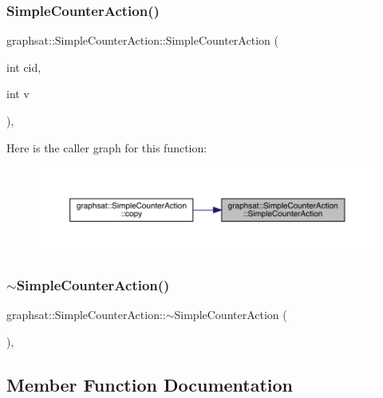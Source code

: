 \subsubsection{\texorpdfstring{SimpleCounterAction()}{SimpleCounterAction()}}
{\footnotesize\ttfamily graphsat\+::\+Simple\+Counter\+Action\+::\+Simple\+Counter\+Action (\begin{DoxyParamCaption}\item[{int}]{cid,  }\item[{int}]{v }\end{DoxyParamCaption})\hspace{0.3cm}{\ttfamily [inline]}, {\ttfamily [private]}}

Here is the caller graph for this function\+:
\nopagebreak
\begin{figure}[H]
\begin{center}
\leavevmode
\includegraphics[width=350pt]{classgraphsat_1_1_simple_counter_action_a3ee736027670066182093dd89fed7261_icgraph}
\end{center}
\end{figure}
\mbox{\label{classgraphsat_1_1_simple_counter_action_a2d4814f53ecc39ea2ab5b6373997ee52}} 
\subsubsection{\texorpdfstring{$\sim$SimpleCounterAction()}{~SimpleCounterAction()}}
{\footnotesize\ttfamily graphsat\+::\+Simple\+Counter\+Action\+::$\sim$\+Simple\+Counter\+Action (\begin{DoxyParamCaption}{ }\end{DoxyParamCaption})\hspace{0.3cm}{\ttfamily [inline]}, {\ttfamily [private]}}



\subsection{Member Function Documentation}
\mbox{\label{classgraphsat_1_1_simple_counter_action_ad84a740a65e18a992f10a606d7f74973}} 
